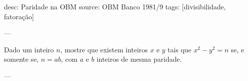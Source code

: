 desc: Paridade na OBM
source:  OBM Banco 1981/9
tags:  [divisibilidade, fatoração]

---

Dado um inteiro $n$, mostre que existem inteiros $x$ e $y$ tais que $x^2 - y^2 = n$ se, e somente se, $n = ab$, com $a$ e $b$ inteiros de mesma paridade.

---

